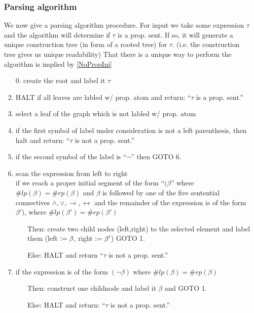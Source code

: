 \subsubsection*{Parsing algorithm}
We now give a parsing algorithm procedure. For input we take some expression $\tau$ and the algorithm will determine if $\tau$ is a prop. sent.
If so, it will generate a unique construction tree (in form of a rooted tree) for $\tau$. (i.e. the construction tree gives us unique readability)
That there is a unique way to perform the algorithm is implied by \ref{NoPropIni}
\begin{enumerate}
    \item[0.] create the root and label it $\tau$
    \item HALT if all leaves are labled w/ prop. atom and return: ``$\tau$ is a prop. sent.''
    \item select a leaf of the graph which is not labled w/ prop. atom
    \item if the first symbol of label under consideration is not a left parenthesis, then halt and return: ``$\tau$ is not a prop. sent.''
    \item if the second symbol of the label is ``$\lnot$'' then GOTO 6.
    \item scan the expression from left to right\\
    if we reach a proper initial segment of the form ``$(\beta$'' where $\# lp(\beta) = \#rp(\beta)$ and $\beta$ is followed by one of the five sentential connectives
    $\land,\lor,\to,\leftrightarrow$ and the remainder of the expression is of the form $\beta')$, where $\# lp(\beta') = \#rp(\beta')$
    \begin{itemize}
        \item [Then:] create two child nodes (left,right) to the selected element and label them (left $\vcentcolon= \beta$, right $\vcentcolon= \beta'$) GOTO 1.
        \item [Else:] HALT and return ``$\tau$ is not a prop. sent.''
    \end{itemize}
    
    \item if the expression is of the form $(\lnot \beta)$ where $\# lp(\beta) = \#rp(\beta)$
    \begin{itemize}
        \item [Then:] construct one childnode and label it $\beta$ and GOTO 1.
        \item [Else:] HALT and return: ``$\tau$ is not a prop. sent.''
    \end{itemize}
\end{enumerate}
